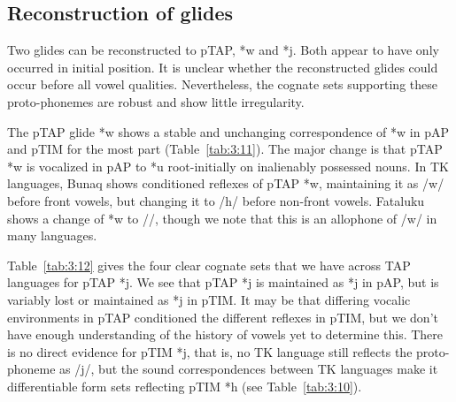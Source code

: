 \subsection{Reconstruction of glides}
Two glides can be reconstructed to pTAP, *w and *j. Both appear to have only occurred in initial position. It is unclear whether the reconstructed glides could occur before all vowel qualities. Nevertheless, the cognate sets supporting these proto-phonemes are robust and show little irregularity.

The pTAP glide *w shows a stable and unchanging correspondence of *w in pAP and pTIM for the most part (Table~\ref{tab:3:11}). The major change is that pTAP *w is vocalized in pAP to *u root-initially on inalienably possessed nouns. In TK languages, Bunaq shows conditioned reflexes of pTAP *w, maintaining it as /w/ before front vowels, but changing it to /h/ before non-front vowels. Fataluku shows a change of *w to /{\textbeta}/, though we note that this is an allophone of /w/ in many languages.
 


Table~\ref{tab:3:12} gives the four clear cognate sets that we have across TAP languages for pTAP *j. We see that pTAP *j is maintained as *j in pAP, but is variably lost or maintained as *j in pTIM. It may be that differing vocalic environments in pTAP conditioned the different reflexes in pTIM, but we don't have enough understanding of the history of vowels yet to determine this. There is no direct evidence for pTIM *j, that is, no TK language still reflects the proto-phoneme as /j/, but the sound correspondences between TK languages make it differentiable form sets reflecting pTIM *h (see Table~\ref{tab:3:10}).

